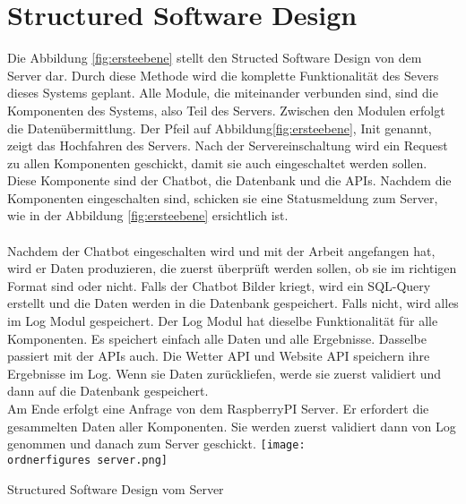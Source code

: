 \section{Structured Software Design}

Die Abbildung \ref{fig:ersteebene} stellt den Structed Software Design von dem Server dar. Durch diese Methode wird die komplette Funktionalität des Severs dieses Systems geplant. Alle Module, die miteinander verbunden sind, sind die Komponenten des Systems, also Teil des Servers. Zwischen den Modulen erfolgt die Daten\"ubermittlung. 
Der Pfeil auf Abbildung\ref{fig:ersteebene}, Init genannt, zeigt das Hochfahren des Servers. Nach der Servereinschaltung wird ein Request zu allen Komponenten geschickt, damit sie auch eingeschaltet werden sollen. Diese Komponente sind der Chatbot, die Datenbank und die APIs. 
Nachdem die Komponenten eingeschalten sind, schicken sie eine Statusmeldung zum Server, wie in der Abbildung \ref{fig:ersteebene} ersichtlich ist. \\
\\
Nachdem der Chatbot eingeschalten wird und mit der Arbeit angefangen hat, wird er Daten produzieren, die zuerst überprüft werden sollen, ob sie im richtigen Format sind oder nicht. Falls der Chatbot Bilder kriegt, wird ein SQL-Query erstellt und die Daten werden in die Datenbank gespeichert. Falls nicht, wird alles im Log Modul gespeichert. Der Log Modul hat dieselbe Funktionalität für alle Komponenten. Es speichert einfach alle Daten und alle Ergebnisse.
Dasselbe passiert mit der APIs auch. Die Wetter API und Website API speichern ihre Ergebnisse im Log. Wenn sie Daten zurückliefen, werde sie zuerst validiert und dann auf die Datenbank gespeichert.\\
Am Ende erfolgt eine Anfrage von dem RaspberryPI Server. Er erfordert die gesammelten Daten aller Komponenten. Sie werden zuerst validiert dann von Log genommen und danach zum Server geschickt.
\captionsetup{type=figure}
\texttt{[image: \\ordnerfigures server.png]}
\caption{Structured Software Design vom Server}
\label{fig:ersteebene}
